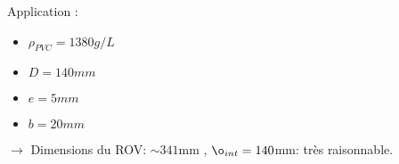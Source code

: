 \documentclass[11pt,a4paper]{article}
\begin{document}
      
      Application :
      \begin{itemize}
        \item $\rho_{PVC} = 1380 g/L$
        \item $D=140mm$
        \item $e=5mm$
        \item $b=20mm$
      \end{itemize}
      $\rightarrow$ Dimensions du ROV: $\sim 341$mm , $\o_{int} = 140$mm: très raisonnable.
      

      
      

        
        
    
    
      
      
      
\end{document}
